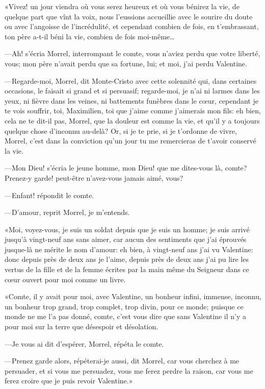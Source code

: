 «Vivez! un jour viendra où vous serez heureux et où vous bénirez la vie, de quelque part que vînt la voix, nous l'eussions accueillie avec le sourire du doute ou avec l'angoisse de l'incrédulité, et cependant combien de fois, en t'embrassant, ton père a-t-il béni la vie, combien de fois moi-même\dots 

—Ah! s'écria Morrel, interrompant le comte, vous n'aviez perdu que votre liberté, vous; mon père n'avait perdu que sa fortune, lui; et moi, j'ai perdu Valentine. 

—Regarde-moi, Morrel, dit Monte-Cristo avec cette solennité qui, dans certaines occasions, le faisait si grand et si persuasif; regarde-moi, je n'ai ni larmes dans les yeux, ni fièvre dans les veines, ni battements funèbres dans le cœur, cependant je te vois souffrir, toi, Maximilien, toi que j'aime comme j'aimerais mon fils: eh bien, cela ne te dit-il pas, Morrel, que la douleur est comme la vie, et qu'il y a toujours quelque chose d'inconnu au-delà? Or, si je te prie, si je t'ordonne de vivre, Morrel, c'est dans la conviction qu'un jour tu me remercieras de t'avoir conservé la vie. 

—Mon Dieu! s'écria le jeune homme, mon Dieu! que me dites-vous là, comte? Prenez-y garde! peut-être n'avez-vous jamais aimé, vous? 

—Enfant! répondit le comte. 

—D'amour, reprit Morrel, je m'entends. 

«Moi, voyez-vous, je suis un soldat depuis que je suis un homme; je suis arrivé jusqu'à vingt-neuf ans sans aimer, car aucun des sentiments que j'ai éprouvés jusque-là ne mérite le nom d'amour: eh bien, à vingt-neuf ans j'ai vu Valentine: donc depuis près de deux ans je l'aime, depuis près de deux ans j'ai pu lire les vertus de la fille et de la femme écrites par la main même du Seigneur dans ce cœur ouvert pour moi comme un livre. 

«Comte, il y avait pour moi, avec Valentine, un bonheur infini, immense, inconnu, un bonheur trop grand, trop complet, trop divin, pour ce monde; puisque ce monde ne me l'a pas donné, comte, c'est vous dire que sans Valentine il n'y a pour moi sur la terre que désespoir et désolation. 

—Je vous ai dit d'espérer, Morrel, répéta le comte. 

—Prenez garde alors, répéterai-je aussi, dit Morrel, car vous cherchez à me persuader, et si vous me persuadez, vous me ferez perdre la raison, car vous me ferez croire que je puis revoir Valentine.» 

